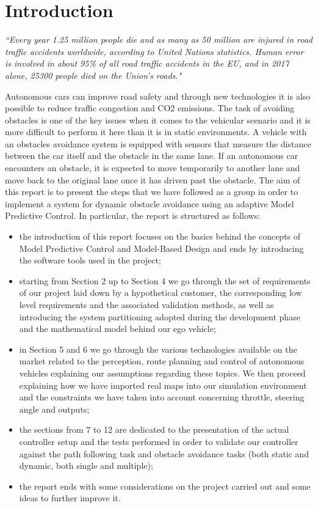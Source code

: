 \section{Introduction}
\label{sec:intro}
\begin{center}
\emph{``Every year 1.25 million people die and as many as 50 million are injured in road
traffic accidents worldwide, according to United Nations statistics. Human error is involved in about 95\% of all road traffic accidents in the EU, and in 2017 alone, 25300 people died on the Union’s roads." \cite{frisoni2016research}}\\
\end{center}
Autonomous cars can improve road safety and through new technologies it is also possible to reduce traffic congestion and CO2 emissions.
The task of avoiding obstacles is one of the key issues when it comes to the vehicular scenario and it is more difficult to perform it here than it is in static environments.
A vehicle with  an obstacles avoidance system is equipped with sensors that measure the distance between the car itself and the obstacle in the same lane. If an autonomous car encounters an obstacle, it is expected to move temporarily to another lane and move back to the original lane once it has driven past the obstacle.
The aim of this report is to present the steps that we have followed as a group in order to implement a system for dynamic obstacle avoidance using an adaptive Model Predictive Control. 
In particular, the report is structured as follows:
\begin{itemize}
    \item the introduction of this report focuses on the basics behind the concepts of Model Predictive Control and Model-Based Design and ends by introducing the software tools used in the project;
    \item starting from Section 2 up to Section 4 we go through the set of requirements of our project laid down by a hypothetical customer, the corresponding low level requirements and the associated validation methods, as well as introducing the system partitioning adopted during the development phase and the mathematical model behind our ego vehicle;
    \item in Section 5 and 6 we go through the various technologies available on the market related to the perception, route planning and control of autonomous vehicles explaining our assumptions regarding these topics. We then proceed explaining how we have imported real maps into our simulation environment and the constraints we have taken into account concerning throttle, steering angle and outputs;
    \item the sections from 7 to 12 are dedicated to the presentation of the actual controller setup and the tests performed in order to validate our controller against the path following task and obstacle avoidance tasks (both static and dynamic, both single and multiple);
   \item the report ends with some considerations on the project carried out and some ideas to further improve it.
\end{itemize}




